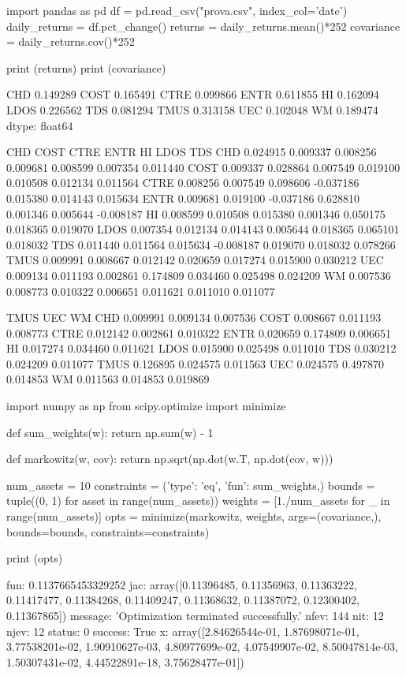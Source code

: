 \cprotEnv \begin{solution}
\begin{ipython}
import pandas as pd
df = pd.read_csv("prova.csv", index_col='date')
daily_returns = df.pct_change()
returns = daily_returns.mean()*252
covariance = daily_returns.cov()*252

print (returns)
print (covariance)

CHD 	0.149289
COST 	0.165491
CTRE 	0.099866
ENTR 	0.611855
HI 		0.162094
LDOS 	0.226562
TDS 	0.081294
TMUS 	0.313158
UEC 	0.102048
WM 		0.189474
dtype: float64

          CHD     COST      CTRE      ENTR       HI     LDOS       TDS
CHD  0.024915 0.009337  0.008256  0.009681 0.008599 0.007354  0.011440
COST 0.009337 0.028864  0.007549  0.019100 0.010508 0.012134  0.011564
CTRE 0.008256 0.007549  0.098606 -0.037186 0.015380 0.014143  0.015634
ENTR 0.009681 0.019100 -0.037186  0.628810 0.001346 0.005644 -0.008187
HI   0.008599 0.010508  0.015380  0.001346 0.050175 0.018365  0.019070
LDOS 0.007354 0.012134  0.014143  0.005644 0.018365 0.065101  0.018032
TDS  0.011440 0.011564  0.015634 -0.008187 0.019070 0.018032  0.078266
TMUS 0.009991 0.008667  0.012142  0.020659 0.017274 0.015900  0.030212
UEC  0.009134 0.011193  0.002861  0.174809 0.034460 0.025498  0.024209
WM   0.007536 0.008773  0.010322  0.006651 0.011621 0.011010  0.011077

         TMUS      UEC       WM
CHD  0.009991 0.009134 0.007536
COST 0.008667 0.011193 0.008773
CTRE 0.012142 0.002861 0.010322
ENTR 0.020659 0.174809 0.006651
HI   0.017274 0.034460 0.011621
LDOS 0.015900 0.025498 0.011010
TDS  0.030212 0.024209 0.011077
TMUS 0.126895 0.024575 0.011563
UEC  0.024575 0.497870 0.014853
WM   0.011563 0.014853 0.019869

import numpy as np
from scipy.optimize import minimize

def sum_weights(w):
    return np.sum(w) - 1

def markowitz(w, cov):
    return np.sqrt(np.dot(w.T, np.dot(cov, w)))

num_assets = 10
constraints = ({'type': 'eq', 'fun': sum_weights},)
bounds = tuple((0, 1) for asset in range(num_assets))
weights = [1./num_assets for _ in range(num_assets)]
opts = minimize(markowitz, weights, args=(covariance,),
    bounds=bounds, constraints=constraints)

print (opts)

    fun: 0.1137665453329252
    jac: array([0.11396485, 0.11356963, 0.11363222, 0.11417477, 0.11384268,
                0.11409247, 0.11368632, 0.11387072, 0.12300402, 0.11367865])
message: 'Optimization terminated successfully.'
   nfev: 144
    nit: 12
   njev: 12
 status: 0
success: True
      x: array([2.84626544e-01, 1.87698071e-01, 3.77538201e-02, 
                1.90910627e-03, 4.80977699e-02, 4.07549907e-02, 
                8.50047814e-03, 1.50307431e-02, 4.44522891e-18, 
                3.75628477e-01])


\end{ipython}
\end{solution}
